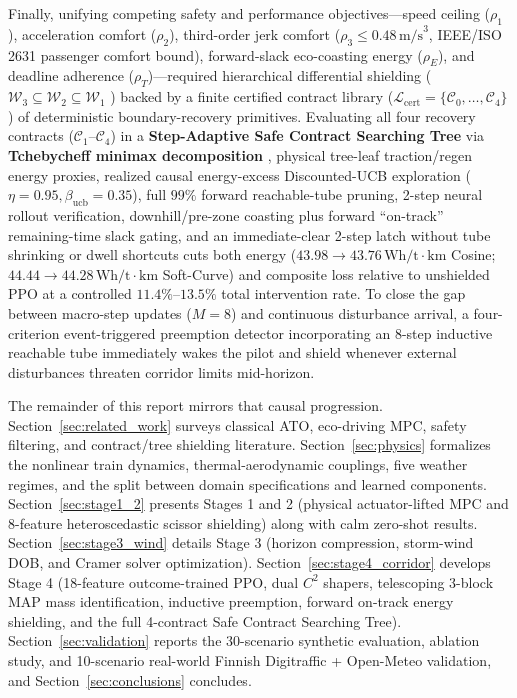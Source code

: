 \documentclass[10pt,a4paper]{article}
\begin{document}
\begin{enumerate}
    Finally, unifying competing safety and performance objectives—speed ceiling ($\rho_1$), acceleration comfort ($\rho_2$), third-order jerk comfort ($\rho_3 \le 0.48\,\text{m/s}^3$, IEEE/ISO 2631 passenger comfort bound), forward-slack eco-coasting energy ($\rho_E$), and deadline adherence ($\rho_T$)—required hierarchical differential shielding ($\mathcal{W}_3 \subseteq \mathcal{W}_2 \subseteq \mathcal{W}_1$ \cite{ref10}) backed by a finite certified contract library ($\mathcal{L}_{\text{cert}} = \{\mathcal{C}_0,\dots,\mathcal{C}_4\}$ \cite{ref11, ref12}) of deterministic boundary-recovery primitives. Evaluating all four recovery contracts ($\mathcal{C}_1\text{--}\mathcal{C}_4$) in a \textbf{Step-Adaptive Safe Contract Searching Tree} \cite{ref22} via \textbf{Tchebycheff minimax decomposition} \cite{ref21}, physical tree-leaf traction/regen energy proxies, realized causal energy-excess Discounted-UCB exploration ($\eta=0.95, \beta_{\text{ucb}}=0.35$), full $99\%$ forward reachable-tube pruning, 2-step neural rollout verification, downhill/pre-zone coasting plus forward ``on-track'' remaining-time slack gating, and an immediate-clear 2-step latch without tube shrinking or dwell shortcuts cuts both energy ($43.98 \to 43.76\,\text{Wh/t}\cdot\text{km}$ Cosine; $44.44 \to 44.28\,\text{Wh/t}\cdot\text{km}$ Soft-Curve) and composite loss relative to unshielded PPO at a controlled $11.4\%\text{--}13.5\%$ total intervention rate. To close the gap between macro-step updates ($M=8$) and continuous disturbance arrival, a four-criterion event-triggered preemption detector incorporating an 8-step inductive reachable tube \cite{ref18, ref21} immediately wakes the pilot and shield whenever external disturbances threaten corridor limits mid-horizon.
\end{enumerate}

The remainder of this report mirrors that causal progression. Section~\ref{sec:related_work} surveys classical ATO, eco-driving MPC, safety filtering, and contract/tree shielding literature. Section~\ref{sec:physics} formalizes the nonlinear train dynamics, thermal-aerodynamic couplings, five weather regimes, and the split between domain specifications and learned components. Section~\ref{sec:stage1_2} presents Stages 1 and 2 (physical actuator-lifted MPC and 8-feature heteroscedastic scissor shielding) along with calm zero-shot results. Section~\ref{sec:stage3_wind} details Stage 3 (horizon compression, storm-wind DOB, and Cramer solver optimization). Section~\ref{sec:stage4_corridor} develops Stage 4 (18-feature outcome-trained PPO, dual $C^2$ shapers, telescoping 3-block MAP mass identification, inductive preemption, forward on-track energy shielding, and the full 4-contract Safe Contract Searching Tree). Section~\ref{sec:validation} reports the 30-scenario synthetic evaluation, ablation study, and 10-scenario real-world Finnish Digitraffic + Open-Meteo validation, and Section~\ref{sec:conclusions} concludes.
\end{document}
